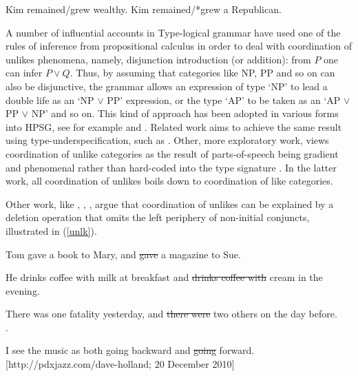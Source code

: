 \documentclass[output=paper
                ,modfonts
                ,nonflat
	        ,collection
	        ,collectionchapter
	        ,collectiontoclongg
 	        ,biblatex
                ,babelshorthands
                ,newtxmath
                ,draftmode
                ,colorlinks, citecolor=brown
]{./langsci/langscibook}
\begin{document}
\begin{exe}
\ex
\begin{xlista}
\ex  Kim remained/grew wealthy.
\ex  Kim remained/*grew a Republican.
\end{xlista}\label{republican}
\end{exe}



\begin{exe}
\ex
\begin{xlista}
\end{xlista}\label{show2}
\end{exe}



A number of influential accounts in Type-logical grammar
\citep{morrill90,morrill94,bayer} have used one of the rules of
inference from propositional calculus in order to deal with
coordination of unlikes phenomena, namely, disjunction introduction
(or addition): from $P$ one can infer $P \vee Q$. 
Thus, by assuming that categories like NP, PP
and so on can also be disjunctive, the grammar allows an expression
of type `NP' to lead a double life as an `NP $\vee$ PP' expression,
or the type `AP' to be taken as an `AP $\vee$ PP $\vee$ NP' and so
on. This kind of approach has been adopted in various forms into HPSG, see for example \citet{Daniels02} and  \citet{Yatabe:04}.
Related work aims to achieve the same result using type-underspecification, such as 
 \citet{sag}. Other, more exploratory work, views coordination of unlike categories as the result of   parts-of-speech being gradient and  phenomenal rather than hard-coded into the type signature  \citep{bookivan}. In the latter work, all coordination 
 of unlikes boils down to coordination of like categories.
 

Other work, like
 \citet{berthold0}, \citet{yatabe},  \citet{Beavers},
 \citet{chaves06}  argue that
coordination of unlikes can be explained by
a deletion operation that omits the left periphery of
non-initial conjuncts, illustrated in   (\ref{unlk}).


\begin{exe}
\ex
\begin{xlista}
\ex Tom gave a book to Mary, and \sout{gave} a magazine to Sue. 

\ex He drinks coffee with milk at breakfast and \sout{drinks coffee with} cream in the evening.\\ \citep{hudson84}

\ex There was one fatality yesterday, and \sout{there were} two others on the day
before.\\
\citep[339]{chavesthesis}.

\ex I see the music as both going backward and \sout{going} forward.\\
{\small [http://pdxjazz.com/dave-holland; 20 December 2010]}
\end{xlista}\label{unlk}
\end{exe}
\end{document}
